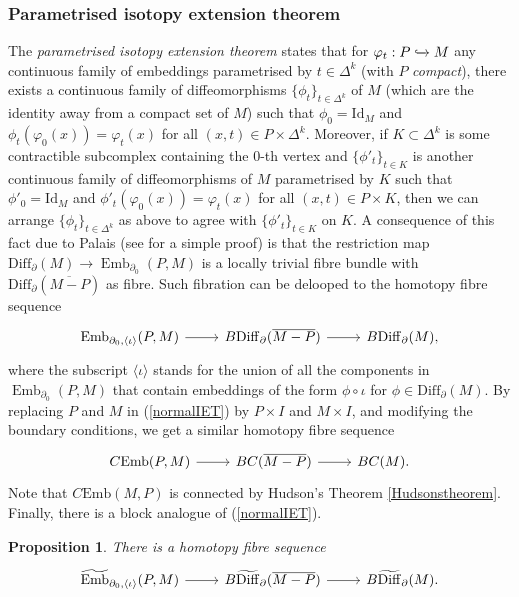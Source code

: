 \documentclass[a4paper, oneside]{amsart}
\newcommand{\diff}{\mathrm{Diff}}
\newcommand{\bdiff}{\widetilde{\mathrm{Diff}}}
\newcommand{\emb}{\operatorname{Emb}}
\newcommand{\bemb}{\widetilde{\operatorname{Emb}}}
\newcommand{\cemb}{C\mathrm{Emb}}
\newcommand{\Id}{\mathrm{Id}}
\newcommand{\1}{\mathds{1}}
\newtheorem{prop}[thm]{Proposition}
\theoremstyle{remark}
\theoremstyle{definition}
\numberwithin{equation}{section}
\begin{document}
\subsubsection{Parametrised isotopy extension theorem}
The \textit{parametrised isotopy extension theorem} states that for $\varphi_t: P\xhookrightarrow{} M$ any continuous family of embeddings parametrised by $t\in \Delta^k$ (with $P$ \textit{compact}), there exists a continuous family of diffeomorphisms $\{\phi_t\}_{t\in \Delta^k}$ of $M$ (which are the identity away from a compact set of $M$) such that $\phi_0=\mathrm{Id}_M$ and $\phi_t(\varphi_0(x))=\varphi_t(x)$ for all $(x,t)\in P\times \Delta^k$. Moreover, if  $K\subset\Delta^k$ is some contractible subcomplex containing the $0$-th vertex and $\{\phi'_t\}_{t\in K}$ is another continuous family of diffeomorphisms of $M$ parametrised by $K$ such that $\phi'_0=\Id_M$ and $\phi'_t(\varphi_0(x))=\varphi_t(x)$ for all $(x,t)\in P\times K$, then we can arrange $\{\phi_t\}_{t\in \Delta^k}$ as above to agree with $\{\phi'_t\}_{t\in K}$ on $K$. A consequence of this fact due to Palais \cite{Palais} (see \cite{Lima1963/64} for a simple proof) is that the restriction map $\diff_\partial(M)\to \emb_{\partial_0}(P,M)$ is a locally trivial fibre bundle with $\diff_{\partial}(\overline{M-P})$ as fibre. Such fibration can be delooped to the homotopy fibre sequence
\begin{equation}\label{normalIET}
\begin{tikzcd}
    \emb_{\partial_0,\langle\iota\rangle}(P,M)\rar & B\diff_\partial(\overline{M-P})\rar &B\diff_\partial(M),
\end{tikzcd}
\end{equation}
where the subscript $\langle\iota\rangle$ stands for the union of all the components in $\emb_{\partial_0}(P,M)$ that contain embeddings of the form $\phi\circ\iota$ for $\phi\in \diff_\partial(M)$. By replacing $P$ and $M$ in (\ref{normalIET}) by $P\times I$ and $M\times I$, and modifying the boundary conditions, we get a similar homotopy fibre sequence
\begin{equation}\label{ConcIET}
\begin{tikzcd}
    \cemb(P,M)\rar & BC(\overline{M-P})\rar &BC(M).
\end{tikzcd}
\end{equation}
Note that $\cemb(M,P)$ is connected by Hudson's Theorem \ref{Hudsonstheorem}. Finally, there is a block analogue of (\ref{normalIET}).

\begin{prop}
There is a homotopy fibre sequence
    \begin{equation}\label{blockIET}
\begin{tikzcd}
    \bemb_{\partial_0,\langle\iota\rangle}(P,M)\rar &B\bdiff_{\partial}(\overline{M-P})\rar&B\bdiff_{\partial}(M).
    \end{tikzcd}
\end{equation}
\end{prop}
\end{document}
